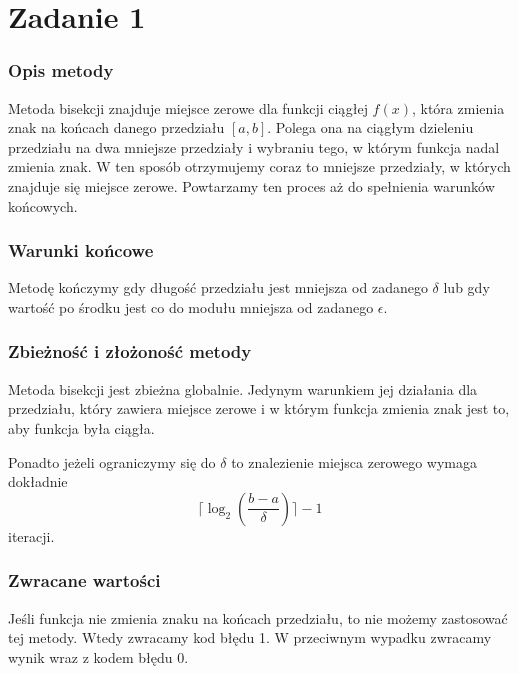 \documentclass{article}
\begin{document}

\section*{Zadanie 1}
\subsubsection*{Opis metody}
Metoda bisekcji znajduje miejsce zerowe dla funkcji ciągłej
$f(x)$, która zmienia znak na końcach danego przedziału $[a,b]$.
Polega ona na ciągłym dzieleniu przedziału na dwa mniejsze przedziały
i wybraniu tego, w którym funkcja nadal zmienia znak.
W ten sposób otrzymujemy coraz to mniejsze
przedziały, w których znajduje się miejsce zerowe.
Powtarzamy ten proces aż do spełnienia warunków końcowych.

\subsubsection*{Warunki końcowe}
Metodę kończymy gdy długość przedziału jest mniejsza od zadanego
$\delta$ lub gdy wartość po środku jest co do modułu
mniejsza od zadanego $\epsilon$.

\subsubsection*{Zbieżność i złożoność metody}
Metoda bisekcji jest zbieżna globalnie. Jedynym warunkiem jej działania
dla przedziału, który zawiera miejsce zerowe i w którym funkcja zmienia
znak jest to, aby funkcja była ciągła.

Ponadto jeżeli ograniczymy się do $\delta$ to znalezienie miejsca
zerowego wymaga dokładnie
\[
  \lceil\log_2(\frac{b-a}{\delta})\rceil - 1
\] iteracji.

\subsubsection*{Zwracane wartości}
Jeśli funkcja nie zmienia znaku na końcach przedziału, to
nie możemy zastosować tej metody. Wtedy zwracamy kod błędu 1.
W przeciwnym wypadku zwracamy wynik wraz z kodem błędu 0.

\clearpage
\end{document}

